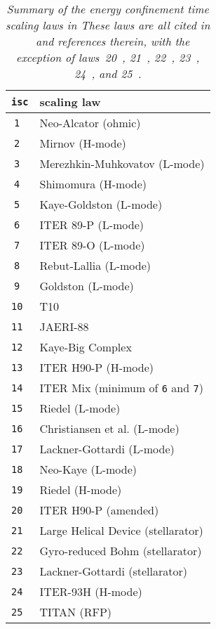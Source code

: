 
\begin{table}[ht]
\begin{center}

\begin{tabular}{||c||l||} \hline
{\tt isc} & scaling law \\ \hline
\tt 1  & \rm Neo-Alcator (ohmic) \\
\tt 2  & \rm Mirnov (H-mode) \\
\tt 3  & \rm Merezhkin-Muhkovatov (L-mode) \\
\tt 4  & \rm Shimomura (H-mode) \\
\tt 5  & \rm Kaye-Goldston (L-mode) \\
\tt 6  & \rm ITER 89-P (L-mode) \\
\tt 7  & \rm ITER 89-O (L-mode) \\
\tt 8  & \rm Rebut-Lallia (L-mode) \\
\tt 9  & \rm Goldston (L-mode) \\
\tt 10 & \rm T10 \\
\tt 11 & \rm JAERI-88 \\
\tt 12 & \rm Kaye-Big Complex \\
\tt 13 & \rm ITER H90-P (H-mode) \\
\tt 14 & \rm ITER Mix (minimum of {\tt 6} and {\tt 7}) \\
\tt 15 & \rm Riedel (L-mode) \\
\tt 16 & \rm Christiansen et al. (L-mode) \\
\tt 17 & \rm Lackner-Gottardi (L-mode) \\
\tt 18 & \rm Neo-Kaye (L-mode) \\
\tt 19 & \rm Riedel (H-mode) \\
\tt 20 & \rm ITER H90-P (amended) \\
\tt 21 & \rm Large Helical Device (stellarator) \\
\tt 22 & \rm Gyro-reduced Bohm (stellarator) \\
\tt 23 & \rm Lackner-Gottardi (stellarator) \\
\tt 24 & \rm ITER-93H (H-mode) \\
\tt 25 & \rm TITAN (RFP) \\ \hline
\end{tabular}
\end{center}
\caption[TABLE_TAU]{{\it
Summary of the energy confinement time scaling laws in \PSD These laws are all
cited in ~\cite{172,IPDG} and references therein, with the exception of
laws~20~\cite{H90P}, 21~\cite{LHD}, 22~\cite{GRB}, 23~\cite{LG}, 
24~\cite{iter93h}, and 25~\cite{titan1}. }}
\label{tab:scaling_laws}
\end{table}
